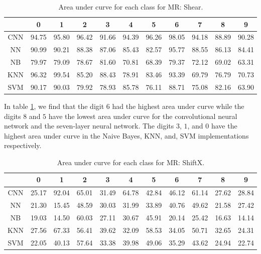     \begin{table}[H]
    \centering
    \begin{tabular}{|c|c|c|c|c|c|c|c|c|c|c|}
    \hline
    & 0 & 1 & 2 & 3 & 4 & 5 & 6 & 7 & 8 & 9 \\
    \hline
    CNN & 94.75 & 95.80 & 96.42 & 91.66 & 94.39 & 96.26 &\cellcolor{green!25}98.05 & 94.18 & \cellcolor{red!25}88.89 & 90.28  \\ 
    \hline
    NN & 90.99 & 90.21 & 88.38 & 87.06 & 85.43 & \cellcolor{red!25}82.57 & \cellcolor{green!25}95.77 & 88.55 & 86.13 & 84.41 \\
    \hline
    NB & 79.97 & 79.09 & 78.67 & \cellcolor{green!25}81.60 & 70.81 & 68.39 & 79.37 & 72.12 & 69.02 & \cellcolor{red!25}63.31 \\
    \hline
    KNN & 96.32 & \cellcolor{green!25}99.54 & 85.20 & 88.43 & 78.91 & 83.46 & 93.39 & \cellcolor{red!25}69.79 & 76.79 & 70.73 \\
    \hline
    SVM & \cellcolor{green!25}90.17 & 90.03 & 79.92 & 78.93 & 85.78 & 76.11 & 88.71 & 75.08 & 82.16 & \cellcolor{red!25}63.90 \\
    \hline
    \end{tabular}
    \caption{Area under curve for each class for MR: Shear.}
    \label{tbl:test-file-formatShear}
    \end{table}
    In table \ref{tbl:test-file-formatShear}, we find that the digit $6$ had the highest area under curve while the digits $8$ and $5$ have the lowest area under curve for the convolutional neural network and the seven-layer neural network. The digits $3$, $1$, and $0$ have the highest area under curve in the Naive Bayes, KNN, and, SVM implementations respectively.
    \begin{table}[htb!]
    \centering
    \begin{tabular}{|c|c|c|c|c|c|c|c|c|c|c|}
    \hline
    & 0 & 1 & 2 & 3 & 4 & 5 & 6 & 7 & 8 & 9 \\
    \hline
    CNN & \cellcolor{red!25}25.17 & \cellcolor{green!25}92.04 & 65.01 & 31.49 & 64.78 & 42.84 & 46.12 & 61.14 & 27.62 & 28.84 \\
    \hline
    NN & 21.30 & \cellcolor{red!25}15.45 & 48.59 & 30.03 & 31.99 & 33.89 & 40.76 & \cellcolor{green!25}49.62 & 21.58 & 27.42 \\
    \hline
    NB & 19.03 & 14.50 & \cellcolor{green!25}60.03 & 27.11 & 30.67 & 45.91 & 20.14 & 25.42 & 16.63 & \cellcolor{red!25}14.14 \\
    \hline
    KNN & 27.56 & \cellcolor{green!25}67.33 & 56.41 & 39.62 & 32.09 & 58.53 & 34.05 & 50.71 & 32.65 & \cellcolor{red!25}24.31 \\
    \hline
    SVM & \cellcolor{red!25}22.05 & 40.13 & \cellcolor{green!25}57.64 & 33.38 & 39.98 & 49.06 & 35.29 & 43.62 & 24.94 & 22.74 \\
    \hline
    \end{tabular}
    \caption{Area under curve for each class for MR: ShiftX.}
    \label{tbl:test-file-formatShiftX}
    \end{table}
    
